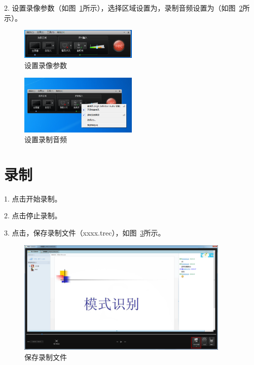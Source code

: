 \documentclass[12pt]{article}
\begin{document}
2. 设置录像参数（如图~\ref{fig:fig2}所示），选择区域设置为{\color{blue}{全屏幕}}，录制音频设置为（如图~\ref{fig:fig3}所示）。
    \begin{figure}[!ht]
    \centering
    \includegraphics[width=0.5\textwidth]{fig2.png}
    \caption{设置录像参数}
    \label{fig:fig2}
    \end{figure}  
    \begin{figure}[!ht]
    \centering
    \includegraphics[width=0.5\textwidth]{fig3.png}
    \caption{设置录制音频}
    \label{fig:fig3}
    \end{figure} 
\section{录制}
1. 点击{\color{blue}{rec}}开始录制。\par
2. 点击{\color{blue}{F10}}停止录制。\par
3. 点击{\color{blue}{保存并编辑}}，保存录制文件（xxxx.trec），如图~\ref{fig:fig4}所示。
    \begin{figure}[!ht]
    \centering
    \includegraphics[width=0.9\textwidth]{fig4.png}
    \caption{保存录制文件}
    \label{fig:fig4}
    \end{figure} 
\end{document}
